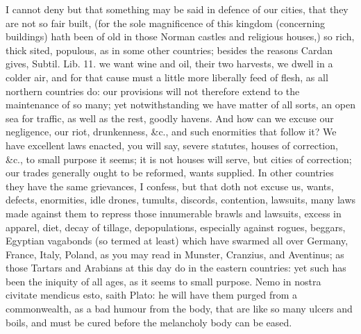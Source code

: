 {I cannot deny but that something may be said in defence of our cities,
that they are not so fair built, (for the sole magnificence of
this kingdom (concerning buildings) hath been of old in those Norman
castles and religious houses,) so rich, thick sited, populous, as in
some other countries; besides the reasons Cardan gives, Subtil. Lib.
11. we want wine and oil, their two harvests, we dwell in a colder air,
and for that cause must a little more liberally feed of flesh, as
all northern countries do: our provisions will not therefore extend to
the maintenance of so many; yet notwithstanding we have matter of all
sorts, an open sea for traffic, as well as the rest, goodly havens. And
how can we excuse our negligence, our riot, drunkenness, \&c., and such
enormities that follow it? We have excellent laws enacted, you will
say, severe statutes, houses of correction, \&c., to small purpose it
seems; it is not houses will serve, but cities of correction; our
trades generally ought to be reformed, wants supplied. In other
countries they have the same grievances, I confess, but that doth not
excuse us, wants, defects, enormities, idle drones, tumults,
discords, contention, lawsuits, many laws made against them to repress
those innumerable brawls and lawsuits, excess in apparel, diet, decay
of tillage, depopulations, especially against rogues, beggars,
Egyptian vagabonds (so termed at least) which have  swarmed all
over Germany, France, Italy, Poland, as you may read in  Munster,
Cranzius, and Aventinus; as those Tartars and Arabians at this day do
in the eastern countries: yet such has been the iniquity of all ages,
as it seems to small purpose. Nemo in nostra civitate mendicus esto,
 saith Plato: he will have them purged from a commonwealth,
as a bad humour from the body, that are like so many ulcers and
boils, and must be cured before the melancholy body can be eased.

}
